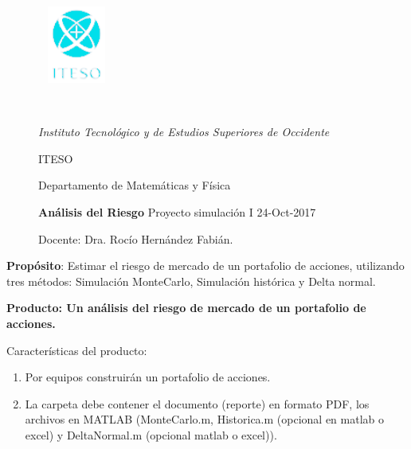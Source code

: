 \documentclass[12pt]{article}
\begin{document}
\begin{figure}[h]
\begin{minipage}{1in}
\centering
\includegraphics[width=1in,height=1in]{LogoITESO.png}
\end{minipage}
\ \ 
\hfill \begin{minipage}{5.5in}
\begin{center}
\emph{Instituto Tecnol\'ogico y de Estudios Superiores de Occidente}

\large{ITESO}

Departamento de Matem\'aticas y F\'isica

\large{\textbf{An\'alisis del Riesgo}}
\vskip0.2in
\small{Proyecto simulaci\'on I}
\small{24-Oct-2017}

Docente: Dra. Roc\'io Hern\'andez Fabi\'an.
\end{center}
\end{minipage}
\end{figure}
\vskip0.2in

\textbf{Prop\'osito}: Estimar el riesgo de mercado de un portafolio de acciones, utilizando tres m\'etodos: Simulaci\'on MonteCarlo, Simulaci\'on hist\'orica y Delta normal.

\textbf{Producto: Un an\'alisis del riesgo de mercado de un portafolio de acciones. }

Caracter\'isticas del producto:
\begin{enumerate}[1.]
	\item Por equipos construir\'an un portafolio de acciones.
	\item La carpeta debe contener el documento (reporte) en formato PDF, los archivos en MATLAB (Monte\-Carlo.m, Historica.m (opcional en matlab o excel) y DeltaNormal.m (opcional matlab o excel)).
\end{enumerate}
\end{document}
